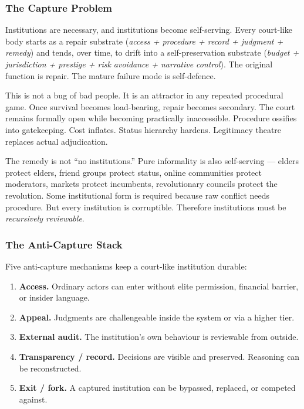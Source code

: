 \documentclass[
]{article}
\providecommand{\tightlist}{%
  \setlength{\itemsep}{0pt}\setlength{\parskip}{0pt}}
\begin{document}
\subsubsection{The Capture Problem}\label{the-capture-problem}

Institutions are necessary, and institutions become self-serving.
Every court-like body starts as a repair substrate (\emph{access +
procedure + record + judgment + remedy}) and tends, over time, to
drift into a self-preservation substrate (\emph{budget +
jurisdiction + prestige + risk avoidance + narrative control}). The
original function is repair. The mature failure mode is
self-defence.

This is not a bug of bad people. It is an attractor in any repeated
procedural game. Once survival becomes load-bearing, repair becomes
secondary. The court remains formally open while becoming
practically inaccessible. Procedure ossifies into gatekeeping. Cost
inflates. Status hierarchy hardens. Legitimacy theatre replaces
actual adjudication.

The remedy is not ``no institutions.'' Pure informality is also
self-serving --- elders protect elders, friend groups protect status,
online communities protect moderators, markets protect incumbents,
revolutionary councils protect the revolution. Some institutional
form is required because raw conflict needs procedure. But every
institution is corruptible. Therefore institutions must be
\emph{recursively reviewable}.

\subsubsection{The Anti-Capture
Stack}\label{the-anti-capture-stack}

Five anti-capture mechanisms keep a court-like institution durable:

\begin{enumerate}
\def\labelenumi{\arabic{enumi}.}
\tightlist
\item
  \textbf{Access.} Ordinary actors can enter without elite
  permission, financial barrier, or insider language.
\item
  \textbf{Appeal.} Judgments are challengeable inside the system or
  via a higher tier.
\item
  \textbf{External audit.} The institution's own behaviour is
  reviewable from outside.
\item
  \textbf{Transparency / record.} Decisions are visible and
  preserved. Reasoning can be reconstructed.
\item
  \textbf{Exit / fork.} A captured institution can be bypassed,
  replaced, or competed against.
\end{enumerate}
\end{document}
